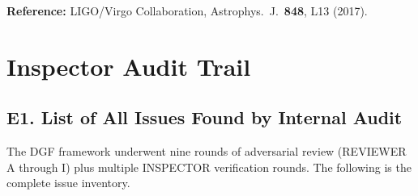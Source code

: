 \documentclass[reprint]{revtex4-2}
\begin{document}
\textbf{Reference:} LIGO/Virgo Collaboration, Astrophys.\ J.\ \textbf{848}, L13 (2017).

\section{Inspector Audit Trail}

\subsection{E1. List of All Issues Found by Internal Audit}

The DGF framework underwent nine rounds of adversarial review (REVIEWER A through I) plus multiple INSPECTOR verification rounds. The following is the complete issue inventory.
\end{document}
